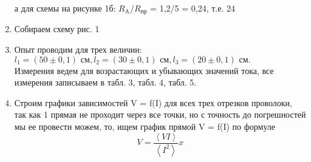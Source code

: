 \documentclass[a4paper, 10pt]{article}%
\begin{document}
\begin{enumerate}
а для схемы на рисунке 1б: $R_{\text{A}}$/$R_{\text{пр}}$ = 1,2/5 = 0,24, т.е. 24%
\newpage
\item Собираем схему рис. 1 \\
\begin{figure}[h]
\end{figure}
\item Опыт проводим для трех величин: 
$ l_1 = (50\pm 0,1) \text{ см}, l_2 = (30\pm0,1) \text{ см}, l_3 = (20\pm 0,1) \text{ см.}$ \\
Измерения ведем для возрастающих и убывающих значений тока, все измерения записываем в табл. 3, табл. 4, табл. 5.
\item Строим графики зависимостей V = f(I) для всех трех отрезков проволоки, так как 1 прямая не проходит через все точки, но с точность до погрешностей мы ее провести можем, то, ищем график прямой V = f(I) по формуле
\[ V = \dfrac{ \left\langle VI \right\rangle }{ \left\langle I^2 \right\rangle } x \]
 \\
\end{enumerate}
\end{document}
